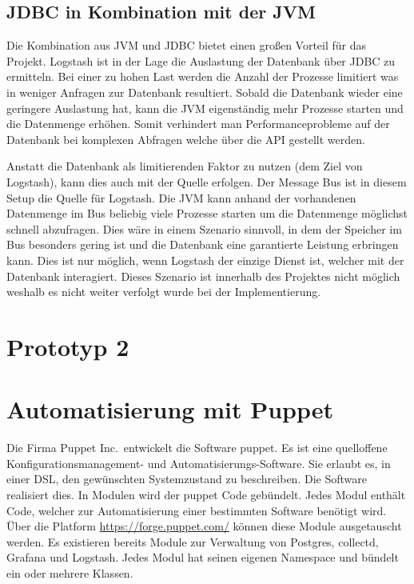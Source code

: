 \subsection{JDBC in Kombination mit der JVM}
Die Kombination aus JVM und JDBC bietet einen großen Vorteil für das Projekt.
Logstash ist in der Lage die Auslastung der Datenbank über JDBC zu ermitteln.
Bei einer zu hohen Last werden die Anzahl der Prozesse limitiert was in weniger
Anfragen zur Datenbank resultiert. Sobald die Datenbank wieder eine geringere
Auslastung hat, kann die JVM eigenständig mehr Prozesse starten und die
Datenmenge erhöhen. Somit verhindert man Performanceprobleme auf der Datenbank
bei komplexen Abfragen welche über die API gestellt werden.

Anstatt die Datenbank als limitierenden Faktor zu nutzen (dem Ziel von
Logstash), kann dies auch mit der Quelle erfolgen. Der Message Bus ist
in diesem Setup die Quelle für Logstash. Die JVM kann anhand der vorhandenen
Datenmenge im Bus beliebig viele Prozesse starten um die Datenmenge möglichst
schnell abzufragen. Dies wäre in einem Szenario sinnvoll, in dem der Speicher
im Bus besonders gering ist und die Datenbank eine garantierte Leistung
erbringen kann. Dies ist nur möglich, wenn Logstash der einzige Dienst ist,
welcher mit der Datenbank interagiert. Dieses Szenario ist innerhalb des
Projektes nicht möglich weshalb es nicht weiter verfolgt wurde bei der
Implementierung.
\tm%


\section{Prototyp 2}

\section{Automatisierung mit Puppet}
Die Firma Puppet Inc.\ entwickelt die Software puppet. Es ist eine quelloffene
Konfigurationsmanagement- und Automatisierungs-Software. Sie erlaubt es, in
einer  \gls{DSL}, den
gewünschten Systemzustand zu beschreiben. Die Software realisiert dies. In
Modulen wird der puppet Code gebündelt. Jedes Modul enthält Code, welcher zur
Automatisierung einer bestimmten Software benötigt wird. Über die Platform
\url{https://forge.puppet.com/} können diese Module ausgetauscht werden. Es
existieren bereits Module zur Verwaltung von Postgres, collectd, Grafana und
Logstash. Jedes Modul hat seinen eigenen \gls{Namespace} und bündelt ein oder
mehrere Klassen.
\tm%

